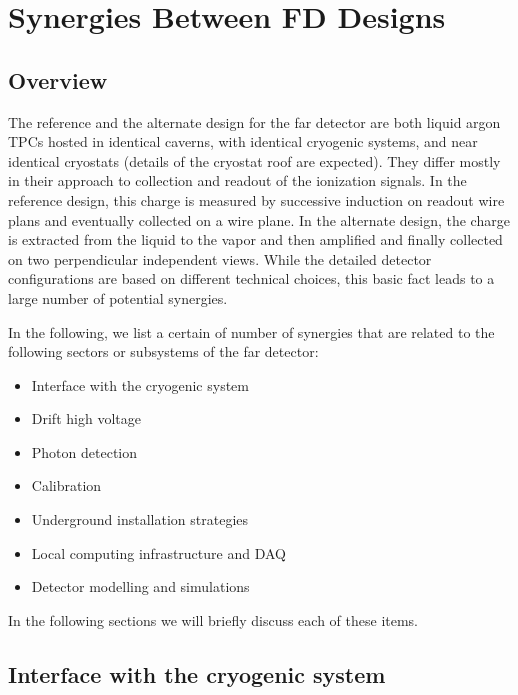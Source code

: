 \chapter{Synergies Between FD Designs}
\label{ch:detectors-synergy}

\section{Overview}

The reference and the alternate design for the far detector are both
liquid argon TPCs hosted in identical caverns, with identical
cryogenic systems, and near identical cryostats (details of the
cryostat roof are expected). They differ mostly in their
approach to collection and readout of the ionization signals. In the
reference design, this charge is measured by successive induction on
readout wire plans and eventually collected on a wire plane. In the
alternate design, the charge is extracted from the liquid to the
vapor and then amplified and finally collected on two perpendicular
independent views. While the detailed detector configurations are
based on different technical choices, this basic fact leads to a large
number of potential synergies.

In the following, we list a certain of number of synergies that are
related to the following sectors or subsystems of the far detector:
\begin{itemize}
\item Interface with the cryogenic system
\item Drift high voltage 
\item Photon detection
\item Calibration
\item Underground installation strategies
\item Local computing infrastructure and DAQ
\item Detector modelling and simulations
\end{itemize}

In the following sections we will briefly discuss each of these items. 
  


\section{Interface with the cryogenic system}

